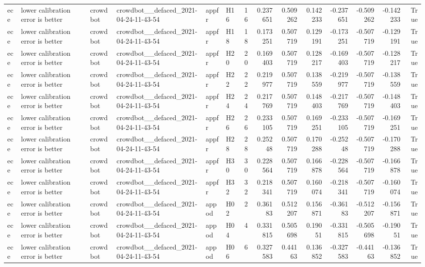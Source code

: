 \begin{longtable}{llllllrrrrrrrr}
ece & lower calibration error is better & crowdbot & crowdbot\_\_defaced\_2021-04-24-11-43-54 & appfr & H16 & 16 & 0.237651 & 0.509262 & 0.142233 & -0.237651 & -0.509262 & -0.142233 & True \\
ece & lower calibration error is better & crowdbot & crowdbot\_\_defaced\_2021-04-24-11-43-54 & appfr & H18 & 18 & 0.173251 & 0.507719 & 0.129191 & -0.173251 & -0.507719 & -0.129191 & True \\
ece & lower calibration error is better & crowdbot & crowdbot\_\_defaced\_2021-04-24-11-43-54 & appfr & H20 & 20 & 0.169403 & 0.507719 & 0.128217 & -0.169403 & -0.507719 & -0.128217 & True \\
ece & lower calibration error is better & crowdbot & crowdbot\_\_defaced\_2021-04-24-11-43-54 & appfr & H22 & 22 & 0.219977 & 0.507719 & 0.138559 & -0.219977 & -0.507719 & -0.138559 & True \\
ece & lower calibration error is better & crowdbot & crowdbot\_\_defaced\_2021-04-24-11-43-54 & appfr & H24 & 24 & 0.217769 & 0.507719 & 0.148403 & -0.217769 & -0.507719 & -0.148403 & True \\
ece & lower calibration error is better & crowdbot & crowdbot\_\_defaced\_2021-04-24-11-43-54 & appfr & H26 & 26 & 0.233105 & 0.507719 & 0.169251 & -0.233105 & -0.507719 & -0.169251 & True \\
ece & lower calibration error is better & crowdbot & crowdbot\_\_defaced\_2021-04-24-11-43-54 & appfr & H28 & 28 & 0.25248 & 0.507719 & 0.170288 & -0.25248 & -0.507719 & -0.170288 & True \\
ece & lower calibration error is better & crowdbot & crowdbot\_\_defaced\_2021-04-24-11-43-54 & appfr & H30 & 30 & 0.228564 & 0.507719 & 0.166878 & -0.228564 & -0.507719 & -0.166878 & True \\
ece & lower calibration error is better & crowdbot & crowdbot\_\_defaced\_2021-04-24-11-43-54 & appfr & H32 & 32 & 0.218341 & 0.507719 & 0.160074 & -0.218341 & -0.507719 & -0.160074 & True \\
ece & lower calibration error is better & crowdbot & crowdbot\_\_defaced\_2021-04-24-11-43-54 & appod & H02 & 2 & 0.36183 & 0.512207 & 0.156871 & -0.36183 & -0.512207 & -0.156871 & True \\
ece & lower calibration error is better & crowdbot & crowdbot\_\_defaced\_2021-04-24-11-43-54 & appod & H04 & 4 & 0.331815 & 0.505698 & 0.19051 & -0.331815 & -0.505698 & -0.19051 & True \\
ece & lower calibration error is better & crowdbot & crowdbot\_\_defaced\_2021-04-24-11-43-54 & appod & H06 & 6 & 0.327583 & 0.44163 & 0.136852 & -0.327583 & -0.44163 & -0.136852 & True \\

\end{longtable}
